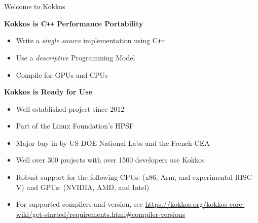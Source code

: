 




\begin{frame}{Welcome to Kokkos}

\textbf{Kokkos is C\texttt{++} Performance Portability}
\begin{scriptsize}
  \begin{itemize} 
	  \item {Write a \textit{single source} implementation using C\texttt{++}}
	  \item {Use a \textit{descriptive} Programming Model}
	  \item {Compile for GPUs and CPUs}
  \end{itemize}
\end{scriptsize}

	\vspace{10pt}

\textbf{Kokkos is Ready for Use}
\begin{scriptsize}
  \begin{itemize}
          \item {Well established project since 2012}
          \item {Part of the Linux Foundation's HPSF}
	  \item {Major buy-in by US DOE National Labs and the French CEA}
	  \item {Well over 300 projects with over 1500 developers use Kokkos}
	  \item {Robust support for the following CPUs: (x86, Arm, and experimental RISC-V) and GPUs: (NVIDIA, AMD, and Intel)}
	  \item {For supported compilers and version, see \url{https://kokkos.org/kokkos-core-wiki/get-started/requirements.html\#compiler-versions}}
  \end{itemize}
\end{scriptsize}

\end{frame}


